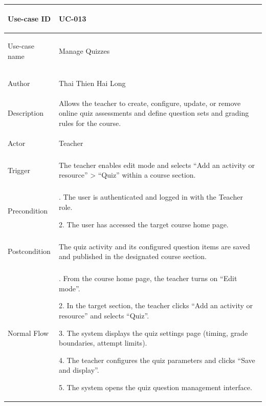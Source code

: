 {
\renewcommand{\arraystretch}{1.1}
\setlength{\tabcolsep}{8pt}
\begin{longtable}{|>{\bfseries\raggedright\arraybackslash}p{}|>{\raggedright\arraybackslash}p{}|}
\hline
Use-case ID & UC-013 \\ \hline
Use-case name & Manage Quizzes \\ \hline
Author & Thai Thien Hai Long \\ \hline
Description &
Allows the teacher to create, configure, update, or remove online quiz assessments and define question sets and grading rules for the course. \\ \hline
Actor & Teacher \\ \hline
Trigger &
The teacher enables edit mode and selects ``Add an activity or resource'' > ``Quiz'' within a course section. \\ \hline
Precondition &
1. The user is authenticated and logged in with the Teacher role. \par
2. The user has accessed the target course home page. \\ \hline
Postcondition &
The quiz activity and its configured question items are saved and published in the designated course section. \\ \hline
Normal Flow &
1. From the course home page, the teacher turns on ``Edit mode''. \par
2. In the target section, the teacher clicks ``Add an activity or resource'' and selects ``Quiz''. \par
3. The system displays the quiz settings page (timing, grade boundaries, attempt limits). \par
4. The teacher configures the quiz parameters and clicks ``Save and display''. \par
5. The system opens the quiz question management interface. \par

\end{longtable}}
